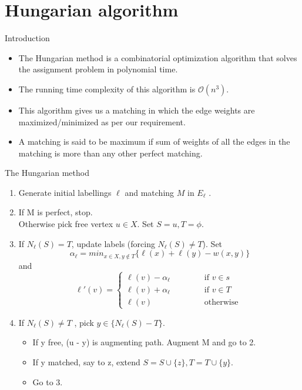 \documentclass[11pt]{beamer}
\theoremstyle{definition}
\begin{document}
\section{Hungarian algorithm}
\begin{frame}{Introduction}
\begin{itemize}

\item The Hungarian method is a combinatorial optimization algorithm that solves the assignment problem in polynomial time.
\item The running time complexity of this algorithm is $\mathcal{O}(n^3)$.
\item This algorithm gives us a matching in which the edge weights are maximized/minimized as per our requirement. 
\item A matching is said to be maximum if sum of weights of all the edges in the matching is more than any other perfect matching.
\end{itemize}
\end{frame}







\begin{frame}{The Hungarian method}
\begin{enumerate}
\item Generate initial labellings $\ell$ and matching $M$ in $E_\ell$ .
\item If M is perfect, stop.\\
Otherwise pick free vertex $u \in X$.
Set $S = {u}, T = \phi$.
\item If $N_\ell (S) = T$, update labels (forcing $N_\ell (S) \neq T $).
Set $$\alpha_\ell =min_{x\in X,y \notin T} \{\ell(x) + \ell(y) - w(x, y)\}$$ and
\begin{equation*}
\ell'(v)=
\left\{ \begin{array}{ll}
\ell(v)-\alpha_\ell  \qquad \quad   & \mbox{ if } v\in s\\
\ell(v)+\alpha_\ell    &  \mbox{ if }v\in T\\
\ell(v)              &  \mbox{ otherwise }
\end{array}\right.
\end{equation*}
\item If $N_\ell (S) \neq T$ , pick $y \in \{N_\ell (S) - T\} $.
\begin{itemize}
\item If y free, (u - y) is augmenting path.
Augment M and go to 2.
\item If y matched, say to z, extend $S = S \cup \{z\}, T = T \cup \{y\}.$
\item Go to 3.
\end{itemize}
\end{enumerate}

\end{frame}
\end{document}
